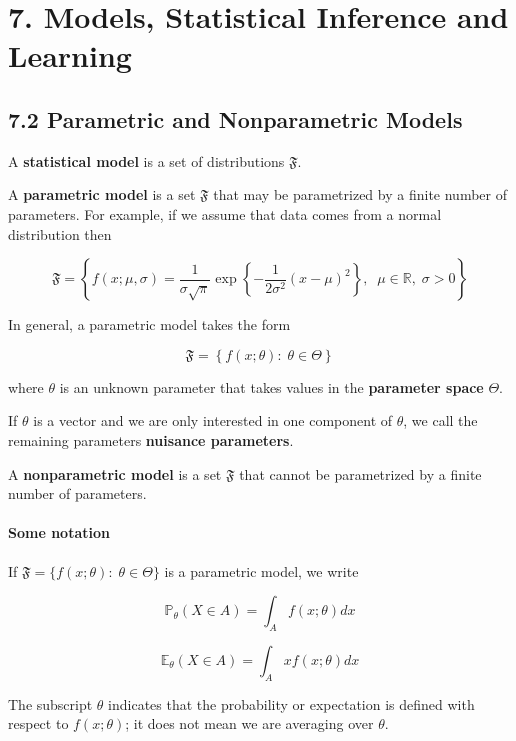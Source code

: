 \section{7. Models, Statistical Inference and Learning}\label{models-statistical-inference-and-learning}

\subsection{7.2 Parametric and Nonparametric
Models}\label{parametric-and-nonparametric-models}

A \textbf{statistical model} is a set of distributions \(\mathfrak{F}\).

A \textbf{parametric model} is a set \(\mathfrak{F}\) that may be
parametrized by a finite number of parameters. For example, if we assume
that data comes from a normal distribution then

\[ \mathfrak{F} = \left\{ f(x; \mu, \sigma) = 
\frac{1}{\sigma\sqrt{\pi}} \exp \left\{ -\frac{1}{2\sigma^2} \left(x - \mu \right)^2 \right\}, \; \; 
\mu \in \mathbb{R}, \; \sigma > 0
\right\} \]

In general, a parametric model takes the form

\[ \mathfrak{F} = \left\{ f(x; \theta) : \; \theta \in \Theta \right\} \]

where \(\theta\) is an unknown parameter that takes values in the
\textbf{parameter space} \(\Theta\).

If \(\theta\) is a vector and we are only interested in one component of
\(\theta\), we call the remaining parameters \textbf{nuisance
parameters}.

A \textbf{nonparametric model} is a set \(\mathfrak{F}\) that cannot be
parametrized by a finite number of parameters.

\paragraph{Some notation}\label{some-notation}

If \(\mathfrak{F} = \{ f(x; \theta) : \; \theta \in \Theta \}\) is a
parametric model, we write

\[\mathbb{P}_\theta(X \in A) = \int_A f(x; \theta)dx\]

\[\mathbb{E}_\theta(X \in A) = \int_A x f(x; \theta)dx\]

The subscript \(\theta\) indicates that the probability or expectation
is defined with respect to \(f(x; \theta)\); it does not mean we are
averaging over \(\theta\).

